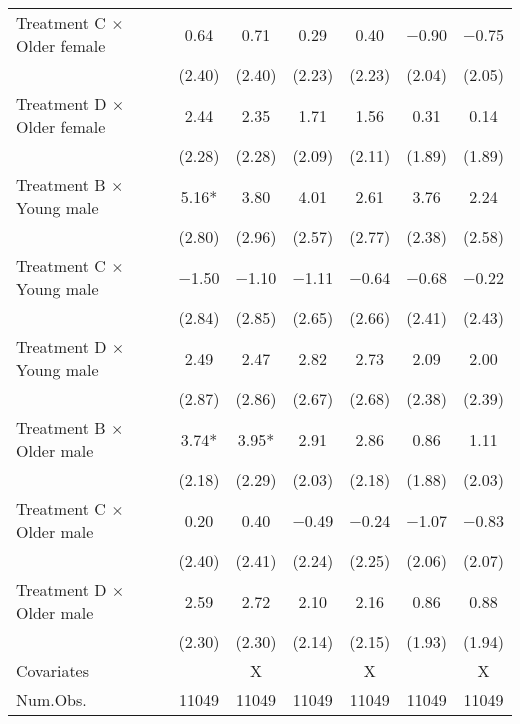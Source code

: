 \documentclass[12pt, a4paper]{article}
\begin{document}
\begin{table}[H]
\begin{threeparttable}
\begin{tabular}[t]{lcccccc}
Treatment C $\times$ Older female & \num{0.64} & \num{0.71} & \num{0.29} & \num{0.40} & \num{-0.90} & \num{-0.75}\\
 & (\num{2.40}) & (\num{2.40}) & (\num{2.23}) & (\num{2.23}) & (\num{2.04}) & (\num{2.05})\\
Treatment D $\times$ Older female & \num{2.44} & \num{2.35} & \num{1.71} & \num{1.56} & \num{0.31} & \num{0.14}\\
 & (\num{2.28}) & (\num{2.28}) & (\num{2.09}) & (\num{2.11}) & (\num{1.89}) & (\num{1.89})\\
Treatment B $\times$ Young male & \num{5.16}* & \num{3.80} & \num{4.01} & \num{2.61} & \num{3.76} & \num{2.24}\\
 & (\num{2.80}) & (\num{2.96}) & (\num{2.57}) & (\num{2.77}) & (\num{2.38}) & (\num{2.58})\\
Treatment C $\times$ Young male & \num{-1.50} & \num{-1.10} & \num{-1.11} & \num{-0.64} & \num{-0.68} & \num{-0.22}\\
 & (\num{2.84}) & (\num{2.85}) & (\num{2.65}) & (\num{2.66}) & (\num{2.41}) & (\num{2.43})\\
Treatment D $\times$ Young male & \num{2.49} & \num{2.47} & \num{2.82} & \num{2.73} & \num{2.09} & \num{2.00}\\
 & (\num{2.87}) & (\num{2.86}) & (\num{2.67}) & (\num{2.68}) & (\num{2.38}) & (\num{2.39})\\
Treatment B $\times$ Older male & \num{3.74}* & \num{3.95}* & \num{2.91} & \num{2.86} & \num{0.86} & \num{1.11}\\
 & (\num{2.18}) & (\num{2.29}) & (\num{2.03}) & (\num{2.18}) & (\num{1.88}) & (\num{2.03})\\
Treatment C $\times$ Older male & \num{0.20} & \num{0.40} & \num{-0.49} & \num{-0.24} & \num{-1.07} & \num{-0.83}\\
 & (\num{2.40}) & (\num{2.41}) & (\num{2.24}) & (\num{2.25}) & (\num{2.06}) & (\num{2.07})\\
Treatment D $\times$ Older male & \num{2.59} & \num{2.72} & \num{2.10} & \num{2.16} & \num{0.86} & \num{0.88}\\
 & (\num{2.30}) & (\num{2.30}) & (\num{2.14}) & (\num{2.15}) & (\num{1.93}) & (\num{1.94})\\
\midrule
Covariates &  & X &  & X &  & X\\
Num.Obs. & \num{11049} & \num{11049} & \num{11049} & \num{11049} & \num{11049} & \num{11049}\\
\bottomrule
\end{tabular}
\begin{tablenotes}

\end{tablenotes}
\end{threeparttable}
\end{table}
\end{document}
